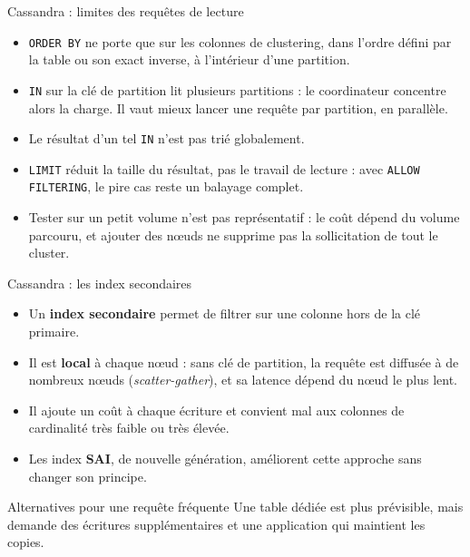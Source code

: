 \begin{frame}{Cassandra : limites des requêtes de lecture}
    \begin{itemize}
        \item \texttt{ORDER BY} ne porte que sur les colonnes de clustering,
              dans l'ordre défini par la table ou son exact inverse, à
              l'intérieur d'une partition.
        \item \texttt{IN} sur la clé de partition lit plusieurs partitions : le
              coordinateur concentre alors la charge. Il vaut mieux lancer une
              requête par partition, en parallèle.
        \item Le résultat d'un tel \texttt{IN} n'est pas trié globalement.
        \item \texttt{LIMIT} réduit la taille du résultat, pas le travail de
              lecture : avec \texttt{ALLOW FILTERING}, le pire cas reste un
              balayage complet.
        \item Tester sur un petit volume n'est pas représentatif : le coût
              dépend du volume parcouru, et ajouter des nœuds ne supprime pas la
              sollicitation de tout le cluster.
    \end{itemize}
\end{frame}

\begin{frame}{Cassandra : les index secondaires}
    \begin{itemize}
        \item Un \textbf{index secondaire} permet de filtrer sur une colonne
              hors de la clé primaire.
        \item Il est \textbf{local} à chaque nœud : sans clé de partition, la
              requête est diffusée à de nombreux nœuds
              (\textit{scatter-gather}), et sa latence dépend du nœud le plus
              lent.
        \item Il ajoute un coût à chaque écriture et convient mal aux colonnes
              de cardinalité très faible ou très élevée.
        \item Les index \textbf{SAI}, de nouvelle génération, améliorent cette
              approche sans changer son principe.
    \end{itemize}

    \begin{examplebox}{Alternatives pour une requête fréquente}
        Une table dédiée est plus prévisible, mais demande des écritures
        supplémentaires et une application qui maintient les copies.
    \end{examplebox}
\end{frame}

